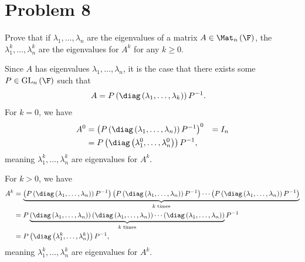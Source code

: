 \documentclass[10pt]{mypackage}
\begin{document}
\section{Problem 8}%
\begin{problem}
  Prove that if $\lambda_1,\dots,\lambda_n$ are the eigenvalues of a matrix $A\in \Mat_{n}\left(\F\right)$, the $\lambda_1^k,\dots,\lambda_n^{k}$ are the eigenvalues for $A^k$ for any $k\geq 0$.
\end{problem}
\begin{solution}
  Since $A$ has eigenvalues $\lambda_1,\dots,\lambda_n$, it is the case that there exists some $P\in \text{GL}_{n}\left(\F\right)$ such that
  \begin{align*}
    A &= P\left(\diag\left(\lambda_1,\dots,\lambda_k\right)\right)P^{-1}.
  \end{align*}
  For $k = 0$, we have
  \begin{align*}
    A^{0}  &= \left(P\left(\diag\left(\lambda_1,\dots,\lambda_n\right)\right)P^{-1}\right)^{0}
           &= I_n\\
           &= P\left(\diag\left(\lambda_1^{0},\dots,\lambda_n^{0}\right)\right)P^{-1},
  \end{align*}
  meaning $\lambda_1^k,\dots,\lambda_n^k$ are eigenvalues for $A^k$.\newline

  For $k > 0$, we have
  \begin{align*}
    A^{k} &= \underbrace{\left(P\left(\diag\left(\lambda_1,\dots,\lambda_n\right)\right)P^{-1}\right)\left(P\left(\diag\left(\lambda_1,\dots,\lambda_n\right)\right)P^{-1}\right)\cdots \left(P\left(\diag\left(\lambda_1,\dots,\lambda_n\right)\right)P^{-1}\right)}_{\text{$k$ times}}\\
          &= P\underbrace{\left(\diag\left(\lambda_1,\dots,\lambda_n\right)\right)\left(\diag\left(\lambda_1,\dots,\lambda_n\right)\right)\cdots\left(\diag\left(\lambda_1,\dots,\lambda_n\right)\right)}_{\text{$k$ times}}P^{-1}\\
          &= P\left(\diag\left(\lambda_1^{k},\dots,\lambda_n^{k}\right)\right)P^{-1},
  \end{align*}
  meaning $\lambda_1^k,\dots,\lambda_n^{k}$ are eigenvalues for $A^{k}$.
\end{solution}
\end{document}

